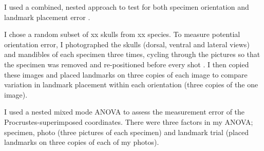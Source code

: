 	I used a combined, nested approach to test for both specimen orientation and landmark placement error \citep{Arnqvist1998, Barrow2008}.

	
	I chose a random subset of xx skulls from xx species. To measure potential orientation error, I photographed the skulls (dorsal, ventral and lateral views) and mandibles of each specimen three times, cycling through the pictures so that the specimen was removed and re-positioned before every shot \citep{Viscosi2011}.  I then copied these images and placed landmarks on three copies of each image to compare variation in landmark placement within each orientation (three copies of the one image).
	
	I used a nested mixed mode ANOVA to assess the measurement error of the Procrustes-superimposed coordinates. There were three factors in my ANOVA; specimen, photo (three pictures of each specimen) and landmark trial (placed landmarks on three copies of each of my photos). 










